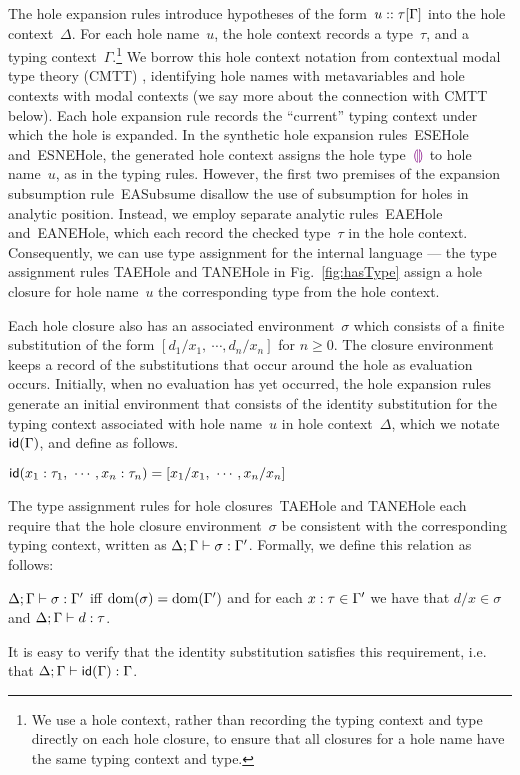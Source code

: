 The hole expansion rules introduce hypotheses of the form~$u :: \tau[\Gamma]$ into the hole context~$\Delta$.
%
For each hole name~$u$, the hole context records a type~$\tau$, and a typing context~$\Gamma$.\footnote{
We use a hole context, rather than recording the typing context and type directly on each hole closure, to ensure that all closures for a hole name have the same typing context and type.}
%
We borrow this hole context notation from contextual modal type theory (CMTT) \cite{Nanevski2008}, identifying hole names with metavariables and hole contexts with modal contexts (we say more about the connection with CMTT below).
%
Each hole expansion rule records the ``current'' typing context under which the hole is expanded.
%
In the synthetic hole expansion rules~{ESEHole} and~{ESNEHole}, the generated hole context assigns the hole type~$\textcolor{violet}{\llparenthesis}\textcolor{violet}{\rrparenthesis}$ to hole name~$u$, as in the typing rules.
%
However, the first two premises of the expansion subsumption rule~{EASubsume} disallow the use of subsumption for holes in analytic position.
%
Instead, we employ separate analytic rules~{EAEHole} and~{EANEHole}, which each record the checked type~$\tau$ in the hole context.
%
Consequently, we can use type assignment for the internal language --- the type assignment rules TAEHole and TANEHole in Fig.~\ref{fig:hasType} assign a hole closure for hole name~$u$ the corresponding type from the hole context.

Each hole closure also has an associated environment~$\sigma$ which consists of a finite substitution of the form $[d_1/x_1, ~\cdots, d_n/x_n]$ for $n \geq 0$.
%
The closure environment keeps a record of the substitutions that occur around the hole as evaluation occurs.
%
Initially, when no evaluation has yet occurred, the hole expansion rules generate an initial environment that consists of the identity substitution for the typing context associated with hole name~$u$ in hole context~$\Delta$, which we notate $\mathsf{id}(\Gamma)$, and define as follows.
%
\begin{defn} $\mathsf{id}(x_1 : \tau_1, ~\cdots, x_n : \tau_n) = [x_1/x_1, ~\cdots, x_n/x_n]$
\end{defn}
\noindent
The type assignment rules for hole closures~{TAEHole} and {TANEHole} each require that the hole closure environment~$\sigma$ be consistent with the corresponding typing context, written as $\Delta; \Gamma \vdash \sigma : \Gamma'$.
%
Formally, we define this relation as follows:
\begin{defn}
$\Delta; \Gamma \vdash \sigma : \Gamma'$ iff $\text{dom}(\sigma) = \text{dom}(\Gamma')$ and for each $x : \tau \in \Gamma'$ we have that $d/x \in \sigma$ and $\Delta; \Gamma \vdash d : \tau$.
\end{defn}
\noindent
It is easy to verify that the identity substitution satisfies this requirement, i.e. that $\Delta; \Gamma \vdash \mathsf{id}(\Gamma) : \Gamma$. 

